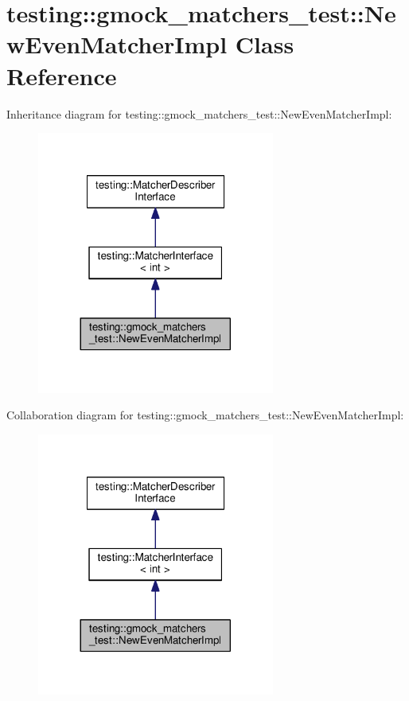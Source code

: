 \hypertarget{classtesting_1_1gmock__matchers__test_1_1NewEvenMatcherImpl}{}\section{testing\+:\+:gmock\+\_\+matchers\+\_\+test\+:\+:New\+Even\+Matcher\+Impl Class Reference}
\label{classtesting_1_1gmock__matchers__test_1_1NewEvenMatcherImpl}


Inheritance diagram for testing\+:\+:gmock\+\_\+matchers\+\_\+test\+:\+:New\+Even\+Matcher\+Impl\+:\nopagebreak
\begin{figure}[H]
\begin{center}
\leavevmode
\includegraphics[width=221pt]{classtesting_1_1gmock__matchers__test_1_1NewEvenMatcherImpl__inherit__graph}
\end{center}
\end{figure}


Collaboration diagram for testing\+:\+:gmock\+\_\+matchers\+\_\+test\+:\+:New\+Even\+Matcher\+Impl\+:\nopagebreak
\begin{figure}[H]
\begin{center}
\leavevmode
\includegraphics[width=221pt]{classtesting_1_1gmock__matchers__test_1_1NewEvenMatcherImpl__coll__graph}
\end{center}
\end{figure}
